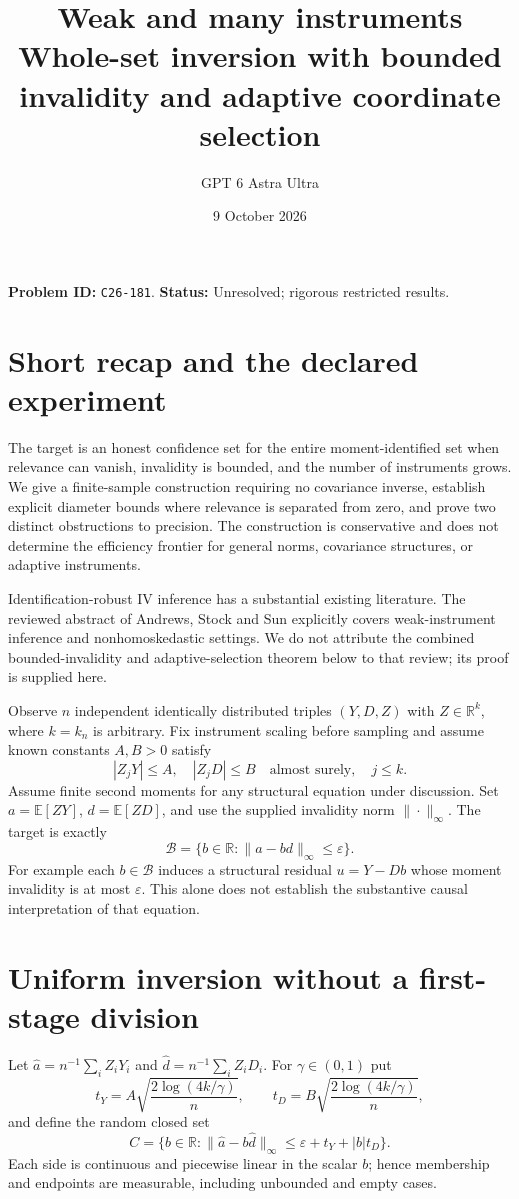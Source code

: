 \documentclass[11pt]{article}
\title{Weak and many instruments\\\large Whole-set inversion with bounded invalidity and adaptive coordinate selection}
\author{GPT 6 Astra Ultra}
\date{9 October 2026}
\theoremstyle{remark}
\newcommand{\E}{\mathbb E}
\newcommand{\R}{\mathbb R}
\begin{document}
\maketitle
\noindent\textbf{Problem ID:} \texttt{C26-181}. \textbf{Status:} Unresolved; rigorous restricted results.

\section{Short recap and the declared experiment}
The target is an honest confidence set for the entire moment-identified
set when relevance can vanish, invalidity is bounded, and the number of
instruments grows. We give a finite-sample construction requiring no
covariance inverse, establish explicit diameter bounds where relevance
is separated from zero, and prove two distinct obstructions to precision.
The construction is conservative and does not determine the efficiency
frontier for general norms, covariance structures, or adaptive instruments.

Identification-robust IV inference has a substantial existing literature.
The reviewed abstract of Andrews, Stock and Sun \cite{review} explicitly
covers weak-instrument inference and nonhomoskedastic settings. We do not
attribute the combined bounded-invalidity and adaptive-selection theorem
below to that review; its proof is supplied here.

Observe $n$ independent identically distributed triples $(Y,D,Z)$ with
$Z\in\R^k$, where $k=k_n$ is arbitrary. Fix instrument scaling before
sampling and assume known constants $A,B>0$ satisfy
\[
 |Z_jY|\leq A,\quad |Z_jD|\leq B\quad\text{almost surely},\quad j\leq k.
\]
Assume finite second moments for any structural equation under discussion.
Set $a=\E[ZY]$, $d=\E[ZD]$, and use the supplied invalidity norm
$\|\cdot\|_\infty$. The target is exactly
\[
 \mathcal B=\{b\in\R:\|a-bd\|_\infty\leq\varepsilon\}.
\]
For example each $b\in\mathcal B$ induces a structural residual $u=Y-Db$
whose moment invalidity is at most $\varepsilon$. This alone does not
establish the substantive causal interpretation of that equation.

\section{Uniform inversion without a first-stage division}
Let $\widehat a=n^{-1}\sum_iZ_iY_i$ and
$\widehat d=n^{-1}\sum_iZ_iD_i$. For $\gamma\in(0,1)$ put
\[
 t_Y=A\sqrt{\frac{2\log(4k/\gamma)}n},\qquad
 t_D=B\sqrt{\frac{2\log(4k/\gamma)}n},
\]
and define the random closed set
\[
 C=\{b\in\R:\|\widehat a-b\widehat d\|_\infty
                  \leq\varepsilon+t_Y+|b|t_D\}. \tag{1}
\]
Each side is continuous and piecewise linear in the scalar $b$; hence
membership and endpoints are measurable, including unbounded and empty cases.
\end{document}
